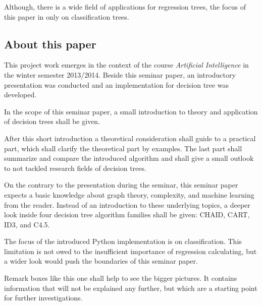    
Although, there is a wide field of applications for regression trees, the focus of this paper in only on classification trees.



\subsection{About this paper}

This project work emerges in the context of the course \textit{Artificial Intelligence} in the winter semester 2013/2014. Beside this seminar paper, an introductory presentation was conducted and an implementation for decision tree was developed. 

In the scope of this seminar paper, a small introduction to theory and application of decision trees shall be given. 

After this short introduction a theoretical consideration shall guide to a practical part, which shall clarify the theoretical part by examples. The last part shall summarize and compare the introduced algorithm and shall give a small outlook to not tackled research fields of decision trees.

On the contrary to the presentation during the seminar, this seminar paper expects a basic knowledge about graph theory, complexity, and machine learning from the reader. Instead of an introduction to these underlying topics, a deeper look inside four decision tree algorithm families shall be given: \textsc{CHAID}, \textsc{CART}, \textsc{ID3}, and \textsc{C4.5}.  

The focus of the introduced Python implementation is on classification. This limitation is not owed to the insufficient importance of regression calculating, but a wider look would push the boundaries of this seminar paper.   

\begin{remark}
    Remark boxes like this one shall help to see the bigger pictures. It contains information that will not be explained any further, but which are a starting point for further investigations.
\end{remark}




\newpage
